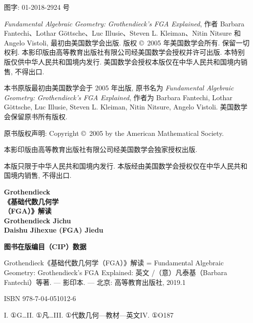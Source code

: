 \begin{titlepage}\fontsize{8}{11}\selectfont
\noindent 图字: 01-2018-2924 号
\par\vspace{5mm}
\textit{Fundamental Algebraic Geometry: Grothendieck's FGA Explained}, 作者 Barbara Fantechi、Lothar Göttsche、Luc Illusie、Steven L. Kleiman、Nitin Nitsure 和 Angelo Vistoli, 最初由美国数学会出版. 版权 \copyright\ 2005 年美国数学会所有. 保留一切权利. 本影印版由高等教育出版社有限公司经美国数学会授权并许可出版. 本特别版仅供中华人民共和国境内发行. 美国数学会授权本版仅在中华人民共和国境内销售, 不得出口.

本书原版最初由美国数学会于 2005 年出版, 原书名为 \textit{Fundamental Algebraic Geometry: Grothendieck's FGA Explained}, 作者为 Barbara Fantechi, Lothar Göttsche, Luc Illusie, Steven L. Kleiman, Nitin Nitsure, Angelo Vistoli. 美国数学会保留原书所有版权.

原书版权声明: Copyright \copyright\ 2005 by the American Mathematical Society.

本影印版由高等教育出版社有限公司经美国数学会独家授权出版.

本版只限于中华人民共和国境内发行. 本版经由美国数学会授权仅在中华人民共和国境内销售, 不得出口.
\par\vspace{6mm}
\noindent\begin{minipage}[t]{43mm}\bfseries Grothendieck\\《基础代数几何学\\（FGA）》解读\\\normalfont\sffamily
Grothendieck Jichu\\Daishu Jihexue (FGA) Jiedu
\end{minipage}\hfill
\begin{minipage}[t]{91mm}
\textbf{图书在版编目（CIP）数据}

Grothendieck《基础代数几何学（FGA）》解读 = Fundamental Algebraic Geometry: Grothendieck's FGA Explained: 英文 /（意）凡泰基（Barbara Fantechi）等著. — 影印本. — 北京: 高等教育出版社, 2019.1

ISBN 978-7-04-051012-6

I. {①}G…\quad II. {①}凡…\quad III. {①}代数几何—教材—英文\quad IV. {①}O187


\end{minipage}
\end{titlepage}
